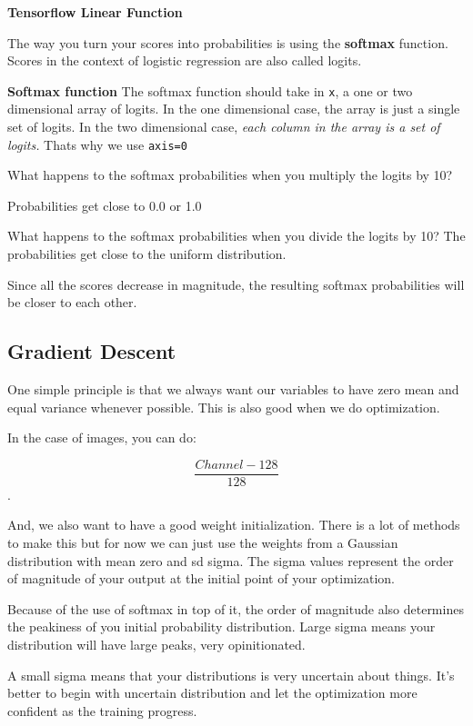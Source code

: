 \documentclass[11pt, a4paper]{article}
\begin{document}
\textbf{Tensorflow Linear Function} 

The way you turn your scores into probabilities is using the \textbf{softmax} function. Scores in the context of logistic regression are also called logits.

\textbf{Softmax function}
The softmax function should take in \texttt{x}, a one or two dimensional array of logits. 
In the one dimensional case, the array is just a single set of logits. In the two dimensional case, \textit{each column in the array is a set of logits.} Thats why we use \texttt{axis=0}



What happens to the softmax probabilities when you multiply the logits by 10?

Probabilities get close to 0.0 or 1.0


What happens to the softmax probabilities when you divide the logits by 10?
The probabilities get close to the uniform distribution.

Since all the scores decrease in magnitude, the resulting softmax probabilities will be closer to each other. 

\subsection{Gradient Descent}%
\label{sub:gradient_descent}

One simple principle is that we always want our variables to have zero mean and equal variance whenever possible. This is also good when we do optimization. 

In the case of images, you can do:

$$ \frac{Channel - 128}{128} $$.

And, we also want to have a good weight initialization. There is a lot of methods to make this but for now we can just use the weights from a Gaussian distribution with mean zero and sd sigma.  The sigma values represent the order of magnitude of your output at the initial point of your optimization.

Because of the use of softmax in top of it, the order of magnitude also determines the peakiness of you initial probability distribution. Large sigma means your distribution will have large peaks, very opinitionated. 

A small sigma means that your distributions is very uncertain about things. It's better to begin with uncertain distribution and let the optimization more confident as the training progress. 
\end{document}
